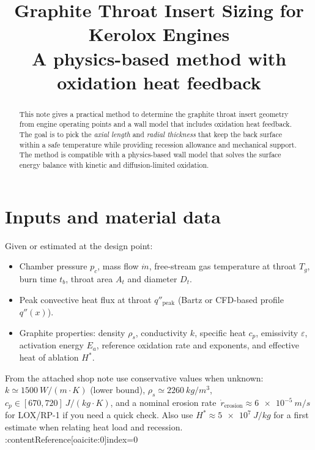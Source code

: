 \documentclass[11pt]{article}
\title{Graphite Throat Insert Sizing for Kerolox Engines\\
A physics-based method with oxidation heat feedback}
\author{ }
\date{ }
\begin{document}
\maketitle

\begin{abstract}
This note gives a practical method to determine the graphite throat insert geometry from engine operating points and a wall model that includes oxidation heat feedback. The goal is to pick the \emph{axial length} and \emph{radial thickness} that keep the back surface within a safe temperature while providing recession allowance and mechanical support. The method is compatible with a physics-based wall model that solves the surface energy balance with kinetic and diffusion-limited oxidation.
\end{abstract}

\section{Inputs and material data}
Given or estimated at the design point:
\begin{itemize}
  \item Chamber pressure $p_c$, mass flow $\dot m$, free-stream gas temperature at throat $T_g$, burn time $t_b$, throat area $A_t$ and diameter $D_t$.
  \item Peak convective heat flux at throat $q''_{\mathrm{peak}}$ (Bartz or CFD-based profile $q''(x)$).
  \item Graphite properties: density $\rho_s$, conductivity $k$, specific heat $c_p$, emissivity $\varepsilon$, activation energy $E_a$, reference oxidation rate and exponents, and effective heat of ablation $H^\ast$.
\end{itemize}

From the attached shop note use conservative values when unknown: $k\simeq \SI{1500}{W/(m\cdot K)}$ (lower bound), $\rho_s\simeq \SI{2260}{kg/m^3}$, $c_p \in [\num{670},\num{720}]~\si{J/(kg\cdot K)}$, and a nominal erosion rate $\,\dot r_{\mathrm{erosion}}\approx \SI{6e-5}{m/s}$ for LOX/RP-1 if you need a quick check. Also use $H^\ast \approx \SI{5e7}{J/kg}$ for a first estimate when relating heat load and recession. :contentReference[oaicite:0]{index=0}
\end{document}
